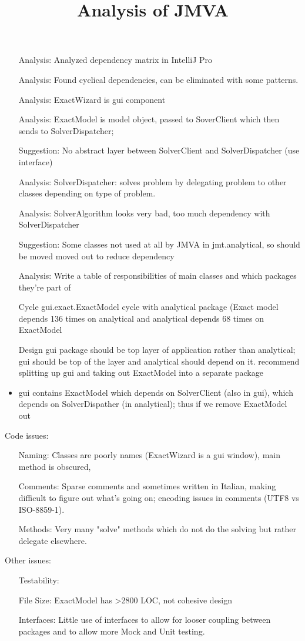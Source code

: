 \documentclass[11pt]{amsart}
\title{Analysis of JMVA}
\begin{document}
\maketitle
\begin{itemize}
\item[Analysis:] Analyzed dependency matrix in IntelliJ Pro
\item[Analysis:] Found cyclical dependencies, can be eliminated with some patterns.
\item[Analysis:] ExactWizard is gui component
\item[Analysis:] ExactModel is model object, passed to SoverClient which then sends to SolverDispatcher;
\item[Suggestion:] No abstract layer between SolverClient and SolverDispatcher (use interface)
\item[Analysis:] SolverDispatcher: solves problem by delegating problem to other classes depending on type of problem.
\item[Analysis:] SolverAlgorithm looks very bad, too much dependency with SolverDispatcher
\item[Suggestion:] Some classes not used at all by JMVA in jmt.analytical, so should be moved moved out to reduce dependency
\item[Analysis:] Write a table of responsibilities of main classes and which packages they're part of
\item[Cycle] gui.exact.ExactModel cycle with analytical package (Exact model depends 136 times on analytical and analytical depends 68 times on ExactModel
\item[Design] gui package should be top layer of application rather than analytical; gui should be top of the layer and analytical should depend on it.  recommend splitting up gui and taking out ExactModel into a separate package
\item gui contains ExactModel which depends on SolverClient (also in gui), which depends on SolverDispather (in analytical); thus if we remove ExactModel out
\end{itemize}

Code issues:
\begin{itemize}
\item[Naming:] Classes are poorly names (ExactWizard is a gui window), main method is obscured, 
\item[Comments:] Sparse comments and sometimes written in Italian, making difficult to figure out what's going on; encoding issues in comments (UTF8 vs ISO-8859-1).
\item[Methods:] Very many "solve" methods which do not do the solving but rather delegate elsewhere.
\end{itemize}

Other issues:
\begin{itemize}
\item[Testability:] 
\item[File Size:] ExactModel has >2800 LOC, not cohesive design
\item[Interfaces:] Little use of interfaces to allow for looser coupling between packages and to allow more Mock and Unit testing.
\end{itemize}
\end{document}
